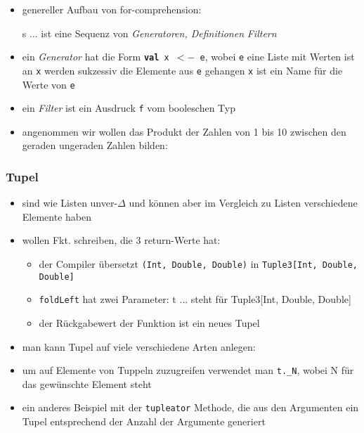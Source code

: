 \begin{itemize}
\begin{itemize}
    \item genereller Aufbau von for-comprehension:
    
    \begin{shadowminipage}
    
    \end{shadowminipage}
    
    
    s $\ldots$ ist eine Sequenz von \textit{Generatoren, Definitionen}
    \und \textit{Filtern}
    \item ein \textit{Generator} hat die Form 
    \texttt{\textbf{val} x $<-$ e}, wobei
    \texttt{e} eine Liste mit Werten ist \und an \texttt{x} 
    werden sukzessiv die Elemente aus \texttt{e} gehangen
    \texttt{x} ist ein Name für die Werte von \texttt{e}
    \item ein \textit{Filter} ist ein Ausdruck \texttt{f} vom 
    booleschen Typ
    \item angenommen wir wollen das Produkt der Zahlen von 1 bis 10
    zwischen den geraden \und ungeraden Zahlen bilden:
    
    
 
  \end{itemize}
\end{itemize}


\subsubsection{Tupel}
\begin{itemize}
  \item sind wie Listen unver-$\Delta$ und können aber im Vergleich
  zu Listen verschiedene Elemente haben
  \item wollen Fkt. schreiben, die 3 return-Werte hat:
  
  
  
  \begin{itemize}
    \item der Compiler übersetzt \texttt{(Int, Double, Double)} in
    \texttt{Tuple3[Int, Double, Double]}
    \item \texttt{foldLeft} hat zwei Parameter: t $\ldots$ steht für 
    Tuple3[Int, Double, Double]
    \item der Rückgabewert der Funktion ist ein neues Tupel
  \end{itemize}
  \item man kann Tupel auf viele verschiedene Arten anlegen:
  
  
  
  \item um auf Elemente von Tuppeln zuzugreifen verwendet man
  \texttt{t.\_N}, wobei N für das gewünschte Element steht
  \item ein anderes Beispiel mit der \texttt{tupleator} Methode, die aus den
  Argumenten ein Tupel entsprechend der Anzahl der Argumente generiert
  
  
\end{itemize}


